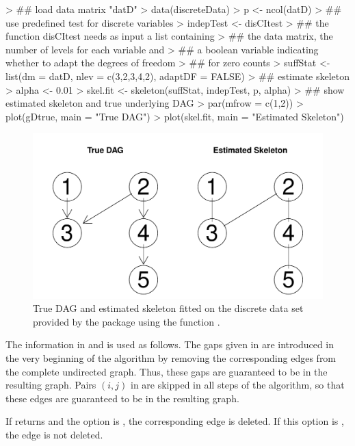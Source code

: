 \documentclass[article]{jss}
\begin{document}
\begin{Schunk}
\begin{Sinput}
> ## load data matrix "datD"
> data(discreteData)
> p <- ncol(datD)
> ## use predefined test for discrete variables
> indepTest <- disCItest
> ## the function disCItest needs as input a list containing
> ## the data matrix, the number of levels for each variable and 
> ## a boolean variable indicating whether to adapt the degrees of freedom
> ## for zero counts
> suffStat <- list(dm = datD, nlev = c(3,2,3,4,2), adaptDF = FALSE)
> ## estimate skeleton 
> alpha <- 0.01 
> skel.fit <- skeleton(suffStat, indepTest, p, alpha)
> ## show estimated skeleton and true underlying DAG
> par(mfrow = c(1,2))
> plot(gDtrue, main = "True DAG")
> plot(skel.fit, main = "Estimated Skeleton")
\end{Sinput}
\end{Schunk}
\begin{figure}
  \begin{center}
\includegraphics{pcalgDoc-skelExp2Plot}
\caption{True DAG and estimated skeleton fitted on the discrete data set provided by the package using the function .}
\label{fig:skel2}
\end{center}
\end{figure}

The information in  and  is used as
follows.  The gaps given in  are introduced in the very
beginning of the algorithm by removing the corresponding edges from the
complete undirected graph. Thus, these gaps are guaranteed to be in the
resulting graph. Pairs $(i,j)$ in  are skipped in
all steps of the algorithm, so that these edges are guaranteed to be in the
resulting graph.

If  returns  and the option  is
, the corresponding edge is deleted. If this option is
, the edge is not deleted.
\end{document}
